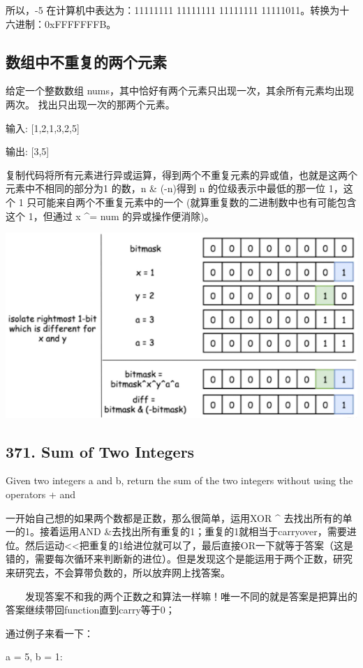\documentclass[9pt, b5paper]{article}
\begin{document}
所以，-5 在计算机中表达为：11111111 11111111 11111111 11111011。转换为十六进制：0xFFFFFFFB。

\subsection{数组中不重复的两个元素}
\label{sec-2-2}
给定一个整数数组 nums，其中恰好有两个元素只出现一次，其余所有元素均出现两次。 找出只出现一次的那两个元素。

输入: [1,2,1,3,2,5]

输出: [3,5]

复制代码将所有元素进行异或运算，得到两个不重复元素的异或值，也就是这两个元素中不相同的部分为1 的数，n \& (-n)得到 n 的位级表示中最低的那一位 1，这个 1 只可能来自两个不重复元素中的一个 (就算重复数的二进制数中也有可能包含这个 1，但通过 x \^{}= num 的异或操作便消除)。

\includegraphics[width=.9\linewidth]{./pic/twoNumberArray.png}

\subsection{371. Sum of Two Integers}
\label{sec-2-3}
Given two integers a and b, return the sum of the two integers without using the operators + and


一开始自己想的如果两个数都是正数，那么很简单，运用XOR  \^{} 去找出所有的单一的1。接着运用AND \&去找出所有重复的1；重复的1就相当于carryover，需要进位。然后运动<<把重复的1给进位就可以了，最后直接OR一下就等于答案（这是错的，需要每次循环来判断新的进位）。但是发现这个是能运用于两个正数，研究来研究去，不会算带负数的，所以放弃网上找答案。

　　发现答案不和我的两个正数之和算法一样嘛！唯一不同的就是答案是把算出的答案继续带回function直到carry等于0；

通过例子来看一下：

a = 5, b = 1:
\end{document}
